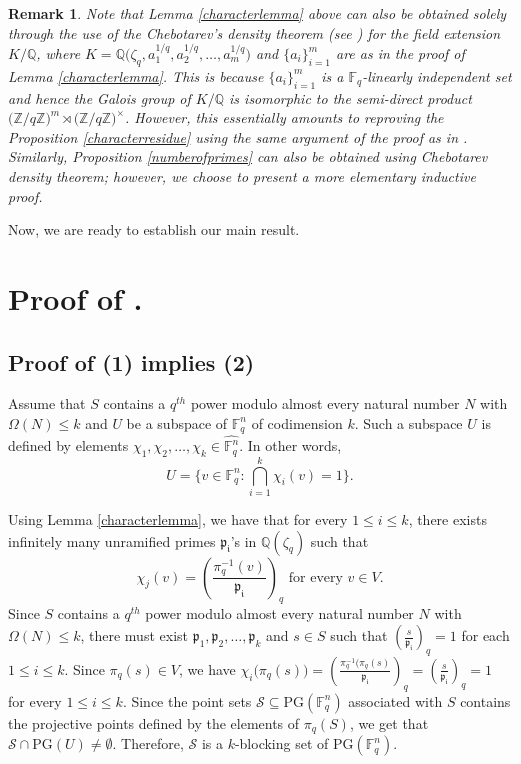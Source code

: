 \documentclass[12pt]{amsart}
\newtheorem{remark}[theorem]{Remark}
\newcommand{\F}{{\mathbb F}}
\newcommand{\PG}{\mathrm{PG}}
\begin{document}
\begin{remark}
Note that Lemma \ref{characterlemma} above can also be obtained solely through the use of the Chebotarev's density theorem (see \cite[Theorem 7.30, pp. 368]{Narkiewicz}) for the field extension $K / \mathbb{Q}$, where $K = \mathbb{Q}\big(\zeta_{q}, a_{1}^{1/q}, a_{2}^{1/q}, \ldots, a_{m}^{1/q}\big)$ and $\{a_{i}\}_{i=1}^{m}$ are as in the proof of Lemma \ref{characterlemma}. This is because $\{a_{i}\}_{i=1}^{m}$ is a $\mathbb{F}_{q}$-linearly independent set and hence the Galois group of $K/\mathbb{Q}$ is isomorphic to the semi-direct product $\big(\mathbb{Z}/q\mathbb{Z}\big)^{m} \rtimes \big(\mathbb{Z}/q\mathbb{Z}\big)^{\times}$. However, this essentially amounts to reproving the Proposition \ref{characterresidue} using the same argument of the proof as in \cite[pp. 380]{Narkiewicz}. Similarly, Proposition \ref{numberofprimes} can also be obtained using Chebotarev density theorem; however, we choose to present a more elementary inductive proof. 
\end{remark}

Now, we are ready to establish our main result. 

\section{Proof of .}
\subsection{Proof of (1) implies (2)}
Assume that $S$ contains a $q^{th}$ power modulo almost every natural number $N$ with $\Omega(N) \leq k$ and $U$ be a subspace of $\mathbb{F}_{q}^{n}$ of codimension $k$. Such a subspace $U$ is defined by elements $\chi_{1}, \chi_{2}, \ldots, \chi_{k} \in \hat{\mathbb{F}_{q}^{n}}$. In other words, \[  U = \Big\{ v \in\mathbb{F}_{q}^{n} : \bigcap_{i=1}^{k} \chi_{i}(v) = 1 \Big\}. \]


Using Lemma \ref{characterlemma}, we have that for every $1 \leq i \leq k$, there exists infinitely many unramified primes $\mathfrak{p_{i}}$'s in $\mathbb{Q}(\zeta_{q})$ such that \[\chi_{j}(v) = \left(\frac{\pi_{q}^{-1}(v)}{\mathfrak{p_{i}}}\right)_{q} \text{ for every } v \in V.\] 
Since $S$ contains a $q^{th}$ power modulo almost every natural number $N$ with $\Omega(N) \leq k$, there must exist $\mathfrak{p}_{1}, \mathfrak{p}_{2}, \ldots, \mathfrak{p}_{k}$ and $s \in S$ such that $\left(\frac{s}{\mathfrak{p_{i}}}\right)_{q} = 1$ for each $1 \leq i \leq k$. Since $\pi_{q}(s) \in V$, we have $\chi_{i}\big(\pi_{q}(s)\big) = \left(\frac{\pi_{q}^{-1}(\pi_{q}(s)}{\mathfrak{p_{i}}}\right)_{q} = \left(\frac{s}{\mathfrak{p_{i}}}\right)_{q} = 1$ for every $1 \leq i \leq k$. Since the point sets $\mathcal{S} \subseteq \PG(\F_q^n)$ associated with $S$ contains the projective points defined by the elements of $\pi_{q}(S)$, we get that $\mathcal{S} \cap \PG(U) \neq \emptyset$. Therefore, $\mathcal{S}$ is a $k$-blocking set of $\PG(\F_q^n)$.
\end{document}
